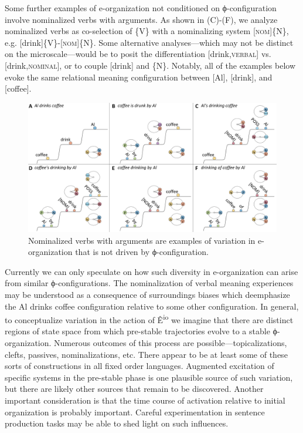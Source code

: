  Some further examples of e-organization not conditioned on ϕ-configuration involve nominalized verbs with arguments. As shown in {}(C)-(F), we analyze nominalized verbs as co-selection of \{V\} with a nominalizing system [\textsc{nom}]\{N\}, e.g. [drink]\{V\}-[\textsc{nom}]\{\textsc{N}\}. Some alternative analyses—which may not be distinct on the microscale—would be to posit the differentiation [drink,\textsc{verbal}] vs. [drink,\textsc{nominal}], or to couple [drink] and \{N\}. Notably, all of the examples below evoke the same relational meaning configuration between [Al], [drink], and [coffee].

  
\begin{figure}
\includegraphics[width=\textwidth]{figures/Tilsen-img82.png}
\caption{Nominalized verbs with arguments are examples of variation in e-organization that is not driven by ϕ-configuration.}
\label{fig:4:32}
\end{figure}
 

  Currently we can only speculate on how such diversity in e-organization can arise from similar ϕ-configurations. The nominalization of verbal meaning experiences may be understood as a consequence of surroundings biases which deemphasize the {\textbar}Al drinks coffee{\textbar} configuration relative to some other configuration. In general, to conceptualize variation in the action of Ê\textsuperscript{io} we imagine that there are distinct regions of state space from which pre-stable trajectories evolve to a stable ϕ-organization. Numerous outcomes of this process are possible—topicalizations, clefts, passives, nominalizations, etc. There appear to be at least some of these sorts of constructions in all fixed order languages. Augmented excitation of specific systems in the pre-stable phase is one plausible source of such variation, but there are likely other sources that remain to be discovered. Another important consideration is that the time course of activation relative to initial organization is probably important. Careful experimentation in sentence production tasks may be able to shed light on such influences.

